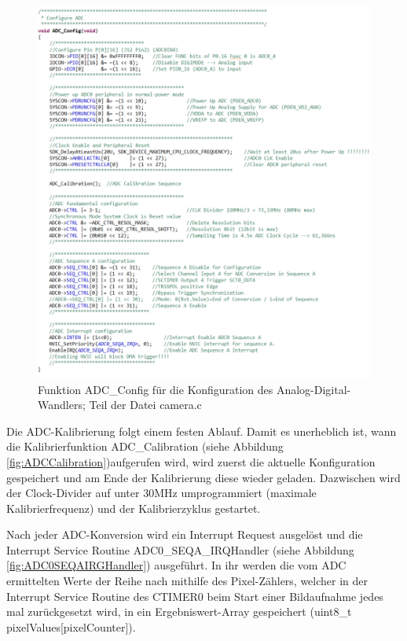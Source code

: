 \begin{figure}[H] %
\includegraphics[width=.95\textwidth]{sec7/images/code/ADCConfig} 
\centering
\captionsetup{width=.95\textwidth}
\caption[Funktion \glqq{}ADC\_Config\grqq{} aus der Datei \glqq{}camera.c\grqq{}]{Funktion \glqq{}ADC\_Config\grqq{} für die Konfiguration des Analog-Digital-Wandlers; Teil der Datei \glqq{}camera.c\grqq{}}\centering
\label{fig:ADCConfig}
\end{figure}


\newpage
Die ADC-Kalibrierung folgt einem festen Ablauf. Damit es unerheblich ist, wann die Kalibrierfunktion \glqq{}ADC\_Calibration\grqq{} (siehe Abbildung \ref{fig:ADCCalibration})aufgerufen wird, wird zuerst die aktuelle Konfiguration gespeichert und am Ende der Kalibrierung diese wieder geladen. Dazwischen wird der Clock-Divider auf unter 30MHz umprogrammiert (maximale Kalibrierfrequenz) und der Kalibrierzyklus gestartet.\vspace{11pt}

Nach jeder ADC-Konversion wird ein Interrupt Request ausgelöst und die Interrupt Service Routine \glqq{}ADC0\_SEQA\_IRQHandler\grqq{} (siehe Abbildung \ref{fig:ADC0SEQAIRGHandler}) ausgeführt.
In ihr werden die vom ADC ermittelten Werte der Reihe nach mithilfe des Pixel-Zählers, welcher in der Interrupt Service Routine des CTIMER0 beim Start einer Bildaufnahme jedes mal zurückgesetzt wird, in ein Ergebniswert-Array gespeichert (uint8\_t pixelValues[pixelCounter]).

